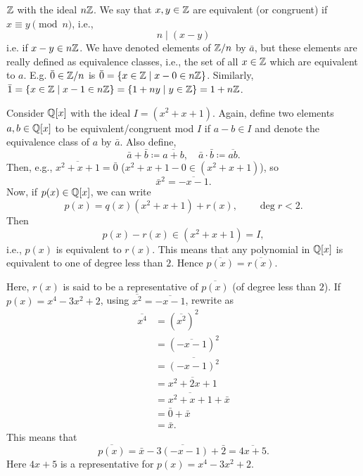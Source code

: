 \documentclass[10pt, a4paper]{article}
\begin{document}
\begin{example}
    $\mathbb{Z}$ with the ideal $n\mathbb{Z}$.
    We say that $x, y \in \mathbb{Z}$ are equivalent
    (or congruent)
    if $x \equiv y\pmod{n}$,
    i.e.,
    \[
    n \mid (x - y)
    \]
    i.e. if $x - y \in n\mathbb{Z}$.
    We have denoted elements of $\mathbb{Z} / n$ by $\bar{a}$,
    but these elements are really defined as equivalence classes,
    i.e.,
    the set of all $x \in \mathbb{Z}$ which are equivalent to $a$.
    E.g. $\bar{0} \in \mathbb{Z} / n$ is $\bar{0} = \{x \in \mathbb{Z} \mid x - 0 \in n\mathbb{Z}\}$.
    Similarly,
    $\bar{1} = \{x \in \mathbb{Z} \mid x - 1 \in n\mathbb{Z}\} = \{1 + ny \mid y \in \mathbb{Z}\} = 1 + n\mathbb{Z}$.
\end{example}

\begin{example}
    Consider $\mathbb{Q}[x]$ with the ideal $I = (x ^ 2 + x + 1)$.
    Again,
    define two elements $a, b \in \mathbb{Q}[x]$ to be equivalent/congruent mod $I$ if $a - b \in I$ and denote the equivalence class of $a$ by $\bar{a}$.
    Also define,
    \[
    \bar{a} + \bar{b} \coloneqq \overline{a + b},\quad \bar{a} \cdot \bar{b} \coloneqq \overline{ab}.
    \]
    Then,
    e.g.,
    $\overline{x ^ 2 + x + 1} = \bar{0}$
    ($x ^ 2 + x + 1 - 0 \in (x ^ 2 + x + 1)$),
    so
    \[
    \bar{x} ^ 2 = \overline{-x - 1}.
    \]
    Now,
    if $p(x) \in \mathbb{Q}[x]$,
    we can write
    \[
    p(x) = q(x)(x ^ 2 + x + 1) + r(x),\qquad\deg{r} < 2.
    \]
    Then
    \[
    p(x) - r(x) \in (x ^ 2 + x + 1) = I,
    \]
    i.e.,
    $p(x)$ is equivalent to $r(x)$.
    This means that any polynomial in $\mathbb{Q}[x]$ is equivalent to one of degree less than $2$.
    Hence $\overline{p(x)} = \overline{r(x)}$.

    Here,
    $r(x)$ is said to be a representative of $\overline{p(x)}$
    (of degree less than $2$).
    If $p(x) = x ^ 4 - 3x ^ 2 + 2$,
    using $\overline{x ^ 2} = \overline{-x - 1}$,
    rewrite as
    \begin{align*}
        \overline{x ^ 4} &= \left(\overline{x ^ 2}\right) ^ 2 \\
        &= \left(\overline{-x - 1}\right) ^ 2 \\
        &= \overline{(-x - 1) ^ 2} \\
        &= \overline{x ^ 2 + 2x + 1} \\
        &= \overline{x ^ 2 + x + 1} + \bar{x} \\
        &= \bar{0} + \bar{x} \\
        &= \bar{x}.
    \end{align*}
    This means that
    \[
    \overline{p(x)} = \bar{x} - \overline{3(-x - 1)} + \bar{2} = \overline{4x + 5}.
    \]
    Here $4x + 5$ is a representative for $p(x) = x ^ 4 - 3x ^ 2 + 2$.
\end{example}
\end{document}
